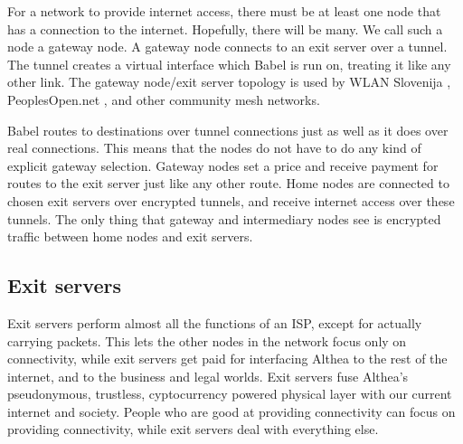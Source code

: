 \documentclass[11pt]{article}
\newlength{\currentparskip}
\newenvironment{unbreakable}
  {\setlength{\currentparskip}{\parskip}%
	 \vspace{\currentparskip}
   \begin{minipage}{\textwidth}%
   \setlength{\parskip}{\currentparskip}%
  }
  {\end{minipage}\vspace{\currentparskip}}
\begin{document}
For a network to provide internet access, there must be at least one node that has a connection to the internet. Hopefully, there will be many. We call such a node a gateway node. A gateway node connects to an exit server over a tunnel. The tunnel creates a virtual interface which Babel is run on, treating it like any other link. The gateway node/exit server topology \cite{exittopology} is used by WLAN Slovenija \cite{wlanslovenija}, PeoplesOpen.net \cite{pplsopen}, and other community mesh networks.


\begin{figure}[h]
\end{figure}

Babel routes to destinations over tunnel connections just as well as it does over real connections. This means that the nodes do not have to do any kind of explicit gateway selection. Gateway nodes set a price and receive payment for routes to the exit server just like any other route. Home nodes are connected to chosen exit servers over encrypted tunnels, and receive internet access over these tunnels. The only thing that gateway and intermediary nodes see is encrypted traffic between home nodes and exit servers.


\subsection{Exit servers}
Exit servers perform almost all the functions of an ISP, except for actually carrying packets. This lets the other nodes in the network focus only on connectivity, while exit servers get paid for interfacing Althea to the rest of the internet, and to the business and legal worlds. Exit servers fuse Althea’s pseudonymous, trustless, cyptocurrency powered physical layer with our current internet and society. People who are good at providing connectivity can focus on providing connectivity, while exit servers deal with everything else. 
\end{document}
